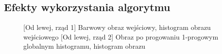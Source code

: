 \documentclass[a4paper,12pt, titlepage]{report}
\begin{document}
\subsection*{Efekty wykorzystania algorytmu}
\begin{figure}[h]
    \centering
    \qquad
    \caption{[Od lewej, rząd 1] Barwowy obraz wejściowy, histogram obrazu wejściowego [Od lewej, rząd 2] Obraz po progowaniu 1-progowym globalnym histogramu, histogram obrazu}%
    \label{fig:geo_after_grey1}%
\end{figure}
\end{document}
